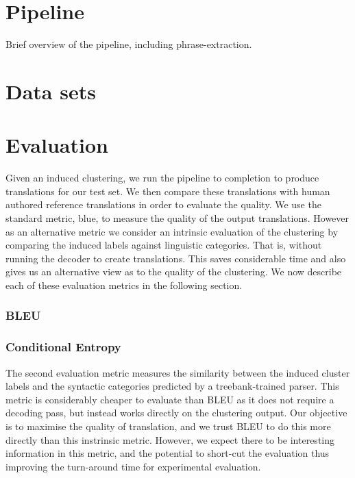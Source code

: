 \section{Pipeline}

Brief overview of the pipeline, including phrase-extraction.

\section{Data sets}\label{sec:datasets}

\section{Evaluation}

Given an induced clustering, we run the pipeline to completion to produce translations for our test set. We then compare these translations with human authored reference translations in order to evaluate the quality. We use the standard metric, blue, to measure the quality of the output translations. However as an alternative metric we consider an intrinsic evaluation of the clustering by comparing the induced labels against linguistic categories. That is, without running the decoder to create translations. This saves considerable time and also gives us an alternative view as to the quality of the clustering. We now describe each of these evaluation metrics in the following section.

\subsubsection{BLEU}


\subsubsection{Conditional Entropy}

The second evaluation metric measures the similarity between the induced cluster labels and the syntactic categories predicted by a treebank-trained parser. This metric is considerably cheaper to evaluate than BLEU as it does not require a decoding pass, but instead works directly on the clustering output. Our objective is to maximise the quality of translation, and we trust BLEU to do this more directly than this instrinsic metric. However, we expect there to be interesting information in this metric, and the potential to short-cut the evaluation thus improving the turn-around time for experimental evaluation. 

